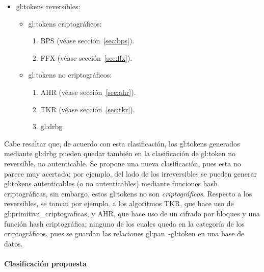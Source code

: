 \begin{itemize}
  \item \Glspl{gl:token} reversibles:
    \begin{itemize}
      \item \Glspl{gl:token} criptográficos:
        \begin{enumerate}
          \item BPS (véase sección~\ref{sec:bps}).
          \item FFX (véase sección~\ref{sec:ffx}).
        \end{enumerate}
      \item \Glspl{gl:token} no criptográficos:
        \begin{enumerate}
          \item AHR (véase sección~\ref{sec:ahr}).
          \item TKR (véase sección~\ref{sec:tkr}).
          \item \gls{gl:drbg}
        \end{enumerate}
    \end{itemize}
\end{itemize}

Cabe resaltar que, de acuerdo con esta clasificación, los \glspl{gl:token}
generados mediante \gls{gl:drbg} pueden quedar también en la clasificación
de \gls{gl:token} no reversible, no autenticable. Se propone una nueva
clasificación, pues esta no parece muy acertada; por ejemplo, del lado de los
irreversibles se pueden generar \glspl{gl:token} autenticables (o no
autenticables) mediante funciones hash criptográficas, sin embargo, estos
\glspl{gl:token} no son \textit{criptográficos}. Respecto a los reversibles,
se toman por ejemplo, a los algoritmos TKR, que hace uso de
\glspl{gl:primitiva_criptografica}, y AHR, que hace uso de un cifrado
por bloques y una función hash criptográfica; ninguno de los cuales queda en
la categoría de los criptográficos, pues se guardan las relaciones
\gls{gl:pan}~-\gls{gl:token} en una base de datos.

\paragraph{Clasificación propuesta}

